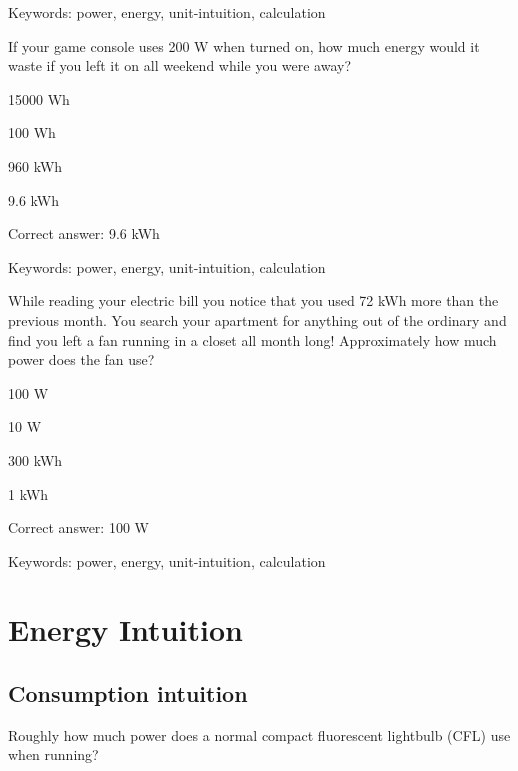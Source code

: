 Keywords: power, energy, unit-intuition, calculation

\begin{question}
	\item If your game console uses 200 W when turned on, how much energy would it waste if you left it on all weekend while you were away?
\end{question}

\begin{answer}
	\item 15000 Wh
	\item 100 Wh
	\item 960 kWh
	\item 9.6 kWh
\end{answer}

Correct answer: 9.6 kWh

Keywords: power, energy, unit-intuition, calculation

\begin{question}
	\item While reading your electric bill you notice that you used 72 kWh more than the previous month. You search your apartment for anything out of the ordinary and find you left a fan running in a closet all month long! Approximately how much power does the fan use?
\end{question}

\begin{answer}
	\item 100 W
	\item 10 W
	\item 300 kWh
	\item 1 kWh
\end{answer}

Correct answer: 100 W

Keywords: power, energy, unit-intuition, calculation


\section{Energy Intuition}


\subsection{Consumption intuition}

\begin{question}
	\item Roughly how much power does a normal compact fluorescent lightbulb (CFL) use when running?
\end{question}

